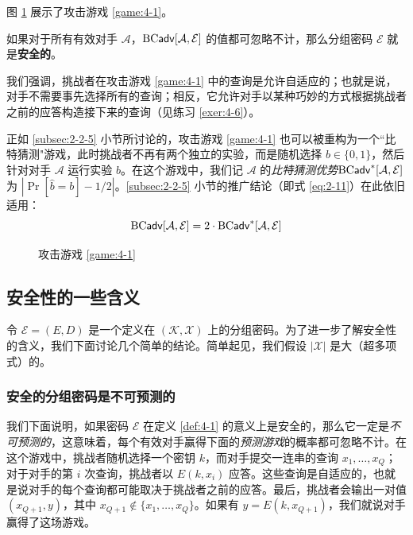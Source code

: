 图 \ref{fig:4-2} 展示了攻击游戏 \ref{game:4-1}。

\begin{definition}[安全的分组密码]\label{def:4-1}
如果对于所有有效对手 $\mathcal{A}$，${\rm BC\mathsf{adv}}[\mathcal{A},\mathcal{E}]$ 的值都可忽略不计，那么分组密码 $\mathcal{E}$ 就是\textbf{安全的}。
\end{definition}

我们强调，挑战者在攻击游戏 \ref{game:4-1} 中的查询是允许自适应的；也就是说，对手不需要事先选择所有的查询；相反，它允许对手以某种巧妙的方式根据挑战者之前的应答构造接下来的查询（见练习 \ref{exer:4-6}）。

正如 \ref{subsec:2-2-5} 小节所讨论的，攻击游戏 \ref{game:4-1} 也可以被重构为一个``比特猜测"游戏，此时挑战者不再有两个独立的实验，而是随机选择 $b\in\{0,1\}$，然后针对对手 $\mathcal{A}$ 运行实验 $b$。在这个游戏中，我们记 $\mathcal{A}$ 的\emph{比特猜测优势}${\rm BC\mathsf{adv}}^*[\mathcal{A},\mathcal{E}]$ 为 $|\Pr[\hat b = b]-{1}/{2}|$。\ref{subsec:2-2-5} 小节的推广结论（即式 \ref{eq:2-11}）在此依旧适用：
\begin{equation}
{\rm BC\mathsf{adv}}[\mathcal{A},\mathcal{E}]=2\cdot{\rm BC\mathsf{adv}}^*[\mathcal{A},\mathcal{E}]
\end{equation}

\begin{figure}[p!]
  \centering
    
  \caption{攻击游戏 \ref{game:4-1}}
  \label{fig:4-2}
\end{figure}

\subsection{安全性的一些含义}\label{subsec:4-1-1}

令 $\mathcal{E}=(E,D)$ 是一个定义在 $(\mathcal{K},\mathcal{X})$ 上的分组密码。为了进一步了解安全性的含义，我们下面讨论几个简单的结论。简单起见，我们假设 $|\mathcal{X}|$ 是大（超多项式）的。

\subsubsection{安全的分组密码是不可预测的}

我们下面说明，如果密码 $\mathcal{E}$ 在定义 \ref{def:4-1} 的意义上是安全的，那么它一定是\emph{不可预测的}，这意味着，每个有效对手赢得下面的\emph{预测游戏}的概率都可忽略不计。在这个游戏中，挑战者随机选择一个密钥 $k$，而对手提交一连串的查询 $x_1,\dots,x_Q$；对于对手的第 $i$ 次查询，挑战者以 $E(k,x_i)$ 应答。这些查询是自适应的，也就是说对手的每个查询都可能取决于挑战者之前的应答。最后，挑战者会输出一对值 $(x_{Q+1},y)$，其中 $x_{Q+1}\notin\{x_1,\dots,x_Q\}$。如果有 $y=E(k,x_{Q+1})$，我们就说对手赢得了这场游戏。

